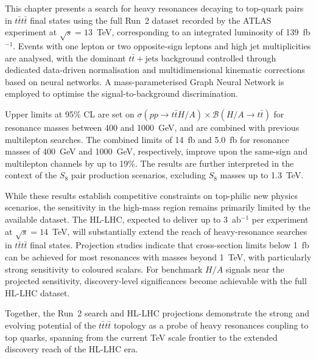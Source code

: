 This chapter presents a search for heavy resonances decaying to top-quark pairs in $t\bar{t}t\bar{t}$ final states using the full Run~2 dataset recorded by the ATLAS experiment at $\sqrt{s}=13$~TeV, corresponding to an integrated luminosity of 139~fb$^{-1}$. 
Events with one lepton or two opposite-sign leptons and high jet multiplicities are analysed, with the dominant $t\bar{t}+\text{jets}$ background controlled through dedicated data-driven normalisation and multidimensional kinematic corrections based on neural networks. 
A mass-parameterised Graph Neural Network is employed to optimise the signal-to-background discrimination.

Upper limits at 95\% CL are set on $\sigma(pp \to t\bar{t}H/A)\times \mathcal{B}(H/A \to t\bar{t})$ for resonance masses between 400 and 1000~GeV, and are combined with previous multilepton searches. 
The combined limits of 14~fb and 5.0~fb for resonance masses of 400~GeV and 1000~GeV, respectively, improve upon the same-sign and multilepton channels by up to 19\%. 
The results are further interpreted in the context of the $S_{8}$ pair production scenarios, excluding $S_{8}$ masses up to 1.3~TeV.

While these results establish competitive constraints on top-philic new physics scenarios, the sensitivity in the high-mass region remains primarily limited by the available dataset. 
The HL-LHC, expected to deliver up to 3~ab$^{-1}$ per experiment at $\sqrt{s}=14$~TeV, will substantially extend the reach of heavy-resonance searches in $t\bar{t}t\bar{t}$ final states. 
Projection studies indicate that cross-section limits below 1~fb can be achieved for most resonances with masses beyond 1~TeV, with particularly strong sensitivity to coloured scalars. 
For benchmark $H/A$ signals near the projected sensitivity, discovery-level significances become achievable with the full HL-LHC dataset.

Together, the Run~2 search and HL-LHC projections demonstrate the strong and evolving potential of the $t\bar{t}t\bar{t}$ topology as a probe of heavy resonances coupling to top quarks, spanning from the current TeV scale frontier to the extended discovery reach of the HL-LHC era.
